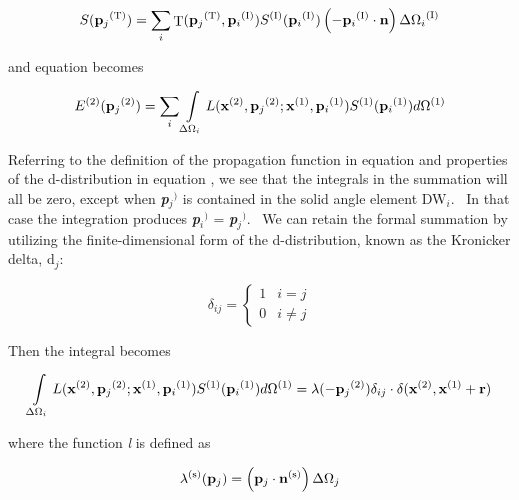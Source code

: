 \begin{equation}
S({{\bf{p}}_j}^{{\rm{(T)}}}) = \sum\limits_i {{\mathop{\rm T}\nolimits} ({{\bf{p}}_j}^{{\rm{(T)}}},{{\bf{p}}_i}^{{\rm{(I)}}}){S^{{\rm{(I)}}}}({{\bf{p}}_i}^{{\rm{(I)}}})\left( { - {{\bf{p}}_i}^{{\rm{(I)}}}\cdot {\bf{n}}} \right)\Delta {\Omega_i}^{{\rm{(I)}}}}
\end{equation}

and equation becomes

\begin{equation}
{E^{(2)}}({{\bf{p}}_j}^{{\rm{(2)}}}) = \sum\limits_i {\int\limits_{\Delta {\Omega_i}} {L({{\bf{x}}^{{\rm{(2)}}}},{{\bf{p}}_j}^{{\rm{(2)}}};{{\bf{x}}^{{\rm{(1)}}}},{{\bf{p}}_i}^{{\rm{(1)}}}){S^{{\rm{(1)}}}}({{\bf{p}}_i}^{{\rm{(1)}}})d{\Omega ^{{\rm{(1)}}}}} }
\end{equation}

Referring to the definition of the propagation function in equation and properties of the d-distribution in equation , we see that the integrals in the summation will all be zero, except when \textbf{\emph{p}}\emph{\(_{j}\)}\(^{)}\) is contained in the solid angle element DW\emph{\(_{i}\)}.~ In that case the integration produces \textbf{\emph{p}}\emph{\(_{i}\)}\(^{)}\) = \textbf{\emph{p}}\emph{\(_{j}\)}\(^{)}\).~ We can retain the formal summation by utilizing the finite-dimensional form of the d-distribution, known as the Kronicker delta, d\emph{\(_{j}\)}:

\begin{equation}
{\delta_{ij}} = \left\{ {\begin{array}{*{20}{c}}1&{i = j}\\0&{i \ne j}\end{array}} \right.
\end{equation}

Then the integral becomes

\begin{equation}
\int\limits_{\Delta {\Omega_i}} {L({{\bf{x}}^{{\rm{(2)}}}},{{\bf{p}}_j}^{{\rm{(2)}}};{{\bf{x}}^{{\rm{(1)}}}},{{\bf{p}}_i}^{{\rm{(1)}}}){S^{{\rm{(1)}}}}({{\bf{p}}_i}^{{\rm{(1)}}})d{\Omega ^{{\rm{(1)}}}}}  = \lambda ( - {{\bf{p}}_j}^{{\rm{(2)}}}){\delta_{ij}} \cdot \delta ({{\bf{x}}^{{\rm{(2)}}}},{{\bf{x}}^{{\rm{(1)}}}} + {\bf{r}})
\end{equation}

where the function \emph{l} is defined as

\begin{equation}
{\lambda ^{{\rm{(s)}}}}({{\bf{p}}_j}) = \left( {{{\bf{p}}_j}\cdot {{\bf{n}}^{{\rm{(s)}}}}} \right)\Delta {\Omega_j}
\end{equation}

